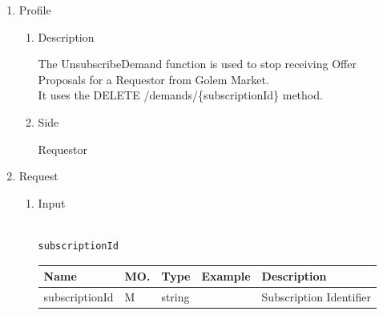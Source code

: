 \begin{enumerate}

\item Profile

\begin{enumerate}

\item Description

The UnsubscribeDemand function is used to stop receiving Offer Proposals for a Requestor from Golem Market. \\ 
It uses the DELETE /demands/\{subscriptionId\} method.

\item Side

Requestor

\end{enumerate}

\item Request

\begin{enumerate}

\item Input

\begin{tcolorbox}[boxrule=0pt, frame empty]
\begin{verbatim}

subscriptionId

\end{verbatim}
\end{tcolorbox}





\begin{table}[H]
\footnotesize

\begin{center}
\begin{tabular}{|p{3cm}|l|p{3cm}|p{3cm}|p{4cm}|} 
\hline
\rowcolor{lightgray}	Name	& MO.	& Type	& Example & 	Description \\
\hline

subscriptionId	& M	& 	string	&		&	Subscription Identifier \\ 


\end{tabular}
\end{center}
\end{table}
\end{enumerate}
\end{enumerate}
